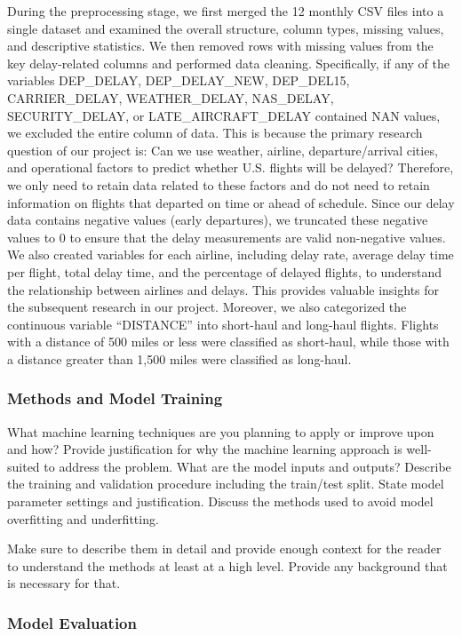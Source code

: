 During the preprocessing stage, we first merged the 12 monthly CSV files into a single dataset and examined the overall structure, column types, missing values, and descriptive statistics. We then removed rows with missing values from the key delay-related columns and performed data cleaning. Specifically, if any of the variables DEP\_DELAY, DEP\_DELAY\_NEW, DEP\_DEL15, CARRIER\_DELAY, WEATHER\_DELAY, NAS\_DELAY, SECURITY\_DELAY, or LATE\_AIRCRAFT\_DELAY contained NAN values, we excluded the entire column of data. This is because the primary research question of our project is: Can we use weather, airline, departure/arrival cities, and operational factors to predict whether U.S. flights will be delayed? Therefore, we only need to retain data related to these factors and do not need to retain information on flights that departed on time or ahead of schedule. Since our delay data contains negative values (early departures), we truncated these negative values to 0 to ensure that the delay measurements are valid non-negative values. We also created variables for each airline, including delay rate, average delay time per flight, total delay time, and the percentage of delayed flights, to understand the relationship between airlines and delays. This provides valuable insights for the subsequent research in our project. Moreover, we also categorized the continuous variable “DISTANCE” into short-haul and long-haul flights. Flights with a distance of 500 miles or less were classified as short-haul, while those with a distance greater than 1,500 miles were classified as long-haul.

\subsubsection{Methods and Model Training} 

What machine learning techniques are you planning to apply or improve upon and how? Provide justification for why the machine learning approach is well-suited to address the problem. What are the model inputs and outputs? Describe the training and validation procedure including the train/test split. State model parameter settings and justification. Discuss the methods used to avoid model overfitting and underfitting. 

Make sure to describe them in detail and provide enough context for the reader to understand the methods at least at a high level. Provide any background that is necessary for that.


\subsubsection{Model Evaluation} 

